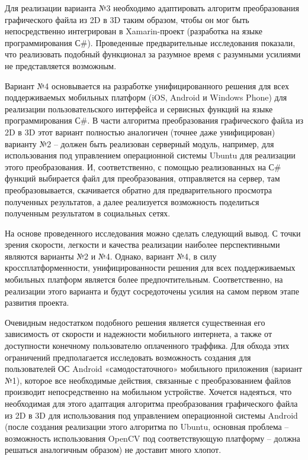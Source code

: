 Для реализации варианта №3 необходимо адаптировать алгоритм преобразования графического файла из 2D в 3D таким образом, чтобы он мог быть непосредственно интегрирован в Xamarin-проект (разработка на языке программирования С\#). Проведенные предварительные исследования показали, что реализовать подобный функционал за разумное время с разумными усилиями не представляется возможным.

Вариант №4 основывается на разработке унифицированного решения для всех поддерживаемых мобильных платформ (iOS, Android и Windows Phone) для реализации пользовательского интерфейса и сервисных функций на языке программирования С\#. В части алгоритма преобразования графического файла из 2D в 3D этот вариант полностью аналогичен (точнее даже унифицирован) варианту №2 – должен быть реализован серверный модуль, например, для использования под управлением операционной системы Ubuntu для реализации этого преобразования. И, соответственно, с помощью реализованных на С\# функций выбирается файл для преобразования, отправляется на сервер, там преобразовывается, скачивается обратно для предварительного просмотра полученных результатов, а далее реализуется возможность поделиться полученным результатом в социальных сетях.

На основе проведенного исследования можно сделать следующий вывод. С точки зрения скорости, легкости и качества реализации наиболее перспективными являются варианты №2 и №4. Однако, вариант №4, в силу кроссплатформенности, унифицированности решения для всех поддерживаемых мобильных платформ является более предпочтительным. Соответственно, на реализации этого варианта и будут сосредоточены усилия на самом первом этапе развития проекта. 

Очевидным недостатком подобного решения является существенная его зависимость от скорости и надежности мобильного интернета, а также от доступности конечному пользователю оплаченного траффика. Для обхода этих ограничений предполагается исследовать возможность создания для пользователей ОС Android «самодостаточного» мобильного приложения (вариант №1), которое все необходимые действия, связанные с преобразованием файлов производит непосредственно на мобильном устройстве. Хочется надеяться, что необходимая для этого адаптация алгоритма преобразования графического файла из 2D в 3D для использования под управлением операционной системы Android (после создания реализации этого алгоритма по Ubuntu, основная проблема – возможность использования OpenCV под соответствующую платформу – должна решаться аналогичным образом) не доставит много хлопот.

